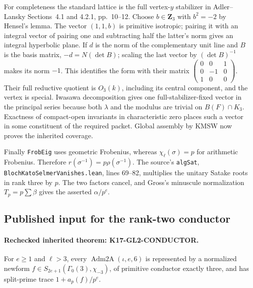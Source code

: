For completeness the standard lattice is the full vertex-$y$
stabilizer in Adler--Lansky Sections~4.1 and 4.2.1, pp.~10--12.
Choose $b\in\mathbf Z_3$ with $b^2=-2$ by Hensel's lemma.
The vector $(1,1,b)$ is primitive isotropic; pairing it with an
integral vector of pairing one and subtracting half the latter's
norm gives an integral hyperbolic plane. If $d$ is the norm of
the complementary unit line and $B$ is the basis matrix,
$-d=N(\det B)$; scaling the last vector by $(\det B)^{-1}$
makes its norm $-1$. This identifies the form with their matrix
$\left(\begin{smallmatrix}0&0&1\\0&-1&0\\1&0&0\end{smallmatrix}\right)$.
Their full reductive quotient is $O_3(k)$, including its central
component, and the vertex is special. Iwasawa decomposition gives
one full-stabilizer-fixed vector in the principal series because
both $\lambda$ and the modulus are trivial on $B(F)\cap K_3$.
Exactness of compact-open invariants in characteristic zero places
such a vector in some constituent of the required packet.
Global assembly by KMSW now proves the inherited coverage.

Finally \texttt{FrobEig} uses geometric Frobenius, whereas
$\chi_\ell(\sigma)=p$ for arithmetic Frobenius.
Therefore $r(\sigma^{-1})=p\rho(\sigma^{-1})$.
The source's \texttt{algSat},
\texttt{BlochKatoSelmerVanishes.lean}, lines 69--82, multiplies
the unitary Satake roots in rank three by $p$.
The two factors cancel, and Gross's minuscule normalization
$T_p=p\sum\beta$ gives the asserted $\alpha/p^e$.

\subsection{Published input for the rank-two conductor}

\paragraph{Rechecked inherited theorem: K17-GL2-CONDUCTOR.}
For $e\geq1$ and $\ell>3$, every
$\operatorname{Adm2A}(\iota,e,6)$ is represented by a normalized
newform $f\in S_{2e+1}(\Gamma_0(3),\chi_{-3})$, of primitive
conductor exactly three, and has split-prime trace
$1+a_p(f)/p^e$.


